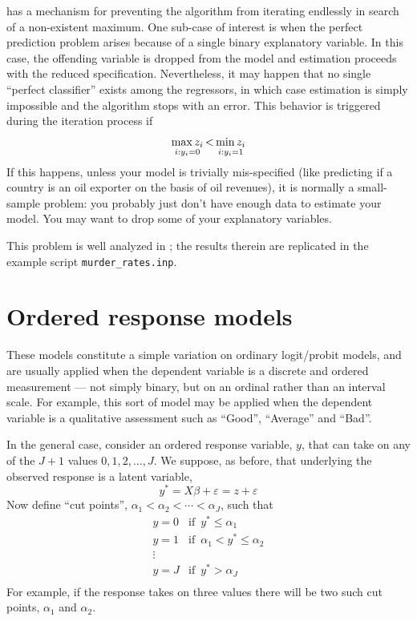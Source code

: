  has a mechanism for preventing the algorithm from
iterating endlessly in search of a non-existent maximum. One sub-case
of interest is when the perfect prediction problem arises because of
a single binary explanatory variable. In this case, the offending
variable is dropped from the model and estimation proceeds with the
reduced specification. Nevertheless, it may happen that no single
``perfect classifier'' exists among the regressors, in which case
estimation is simply impossible and the algorithm stops with an
error. This behavior is triggered during the iteration process if
\[
  \stackunder{i: y_i = 0}{\max z_i} \, < \,
  \stackunder{i: y_i = 1}{\min z_i}  
\]
If this happens, unless your model is trivially mis-specified (like
predicting if a country is an oil exporter on the basis of oil
revenues), it is normally a small-sample problem: you probably just
don't have enough data to estimate your model. You may want to drop
some of your explanatory variables.

This problem is well analyzed in \cite{stokes04}; the results therein
are replicated in the example script \texttt{murder\_rates.inp}. 

\section{Ordered response models}
\label{sec:ordered}

These models constitute a simple variation on ordinary logit/probit
models, and are usually applied when the dependent variable is a
discrete and ordered measurement --- not simply binary, but on an
ordinal rather than an interval scale.  For example, this sort of
model may be applied when the dependent variable is a qualitative
assessment such as ``Good'', ``Average'' and ``Bad''.  

In the general case, consider an ordered response variable, $y$, that
can take on any of the $J+1$ values ${0,1,2,\dots,J}$.  We suppose, as
before, that underlying the observed response is a latent variable,
\[
  y^* = X\beta + \varepsilon = z + \varepsilon
\]
Now define ``cut points'', $\alpha_1 < \alpha_2 < \cdots < \alpha_J$,
such that
%
\begin{equation*}
  \begin{array}{ll}
    y = 0 & \textrm{if } \, y^* \leq \alpha_1 \\
    y = 1 & \textrm{if } \, \alpha_1 < y^* \leq \alpha_2 \\
    \vdots \\
    y = J & \textrm{if } \, y^* > \alpha_J \\
  \end{array}
\end{equation*}
For example, if the response takes on three values there will be two
such cut points, $\alpha_1$ and $\alpha_2$. 

